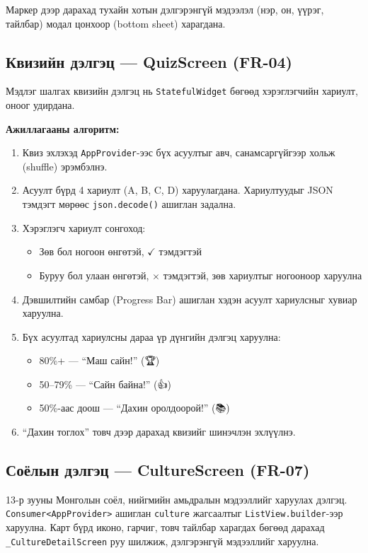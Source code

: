 Маркер дээр дарахад тухайн хотын дэлгэрэнгүй мэдээлэл (нэр, он, үүрэг, тайлбар) модал цонхоор (bottom sheet) харагдана.

\subsection{Квизийн дэлгэц — QuizScreen (FR-04)}

Мэдлэг шалгах квизийн дэлгэц нь \texttt{StatefulWidget} бөгөөд хэрэглэгчийн хариулт, оноог удирдана.

\textbf{Ажиллагааны алгоритм:}
\begin{enumerate}
	\item Квиз эхлэхэд \texttt{AppProvider}-ээс бүх асуултыг авч, санамсаргүйгээр хольж (shuffle) эрэмбэлнэ.
	\item Асуулт бүрд 4 хариулт (A, B, C, D) харуулагдана. Хариултуудыг JSON тэмдэгт мөрөөс \texttt{json.decode()} ашиглан задална.
	\item Хэрэглэгч хариулт сонгоход:
	\begin{itemize}
		\item Зөв бол ногоон өнгөтэй, $\checkmark$ тэмдэгтэй
		\item Буруу бол улаан өнгөтэй, $\times$ тэмдэгтэй, зөв хариултыг ногооноор харуулна
	\end{itemize}
	\item Дэвшилтийн самбар (Progress Bar) ашиглан хэдэн асуулт хариулсныг хувиар харуулна.
	\item Бүх асуултад хариулсны дараа үр дүнгийн дэлгэц харуулна:
	\begin{itemize}
		\item 80\%+ — ``Маш сайн!'' ({\emojifont 🏆})
		\item 50--79\% — ``Сайн байна!'' ({\emojifont 👍})
		\item 50\%-аас доош — ``Дахин оролдоорой!'' ({\emojifont 📚})
	\end{itemize}
	\item ``Дахин тоглох'' товч дээр дарахад квизийг шинэчлэн эхлүүлнэ.
\end{enumerate}

\subsection{Соёлын дэлгэц — CultureScreen (FR-07)}

13-р зууны Монголын соёл, нийгмийн амьдралын мэдээллийг харуулах дэлгэц. \texttt{Consumer<AppProvider>} ашиглан \texttt{culture} жагсаалтыг \texttt{ListView.builder}-ээр харуулна. Карт бүрд иконо, гарчиг, товч тайлбар харагдах бөгөөд дарахад \texttt{\_CultureDetailScreen} руу шилжиж, дэлгэрэнгүй мэдээллийг харуулна.

